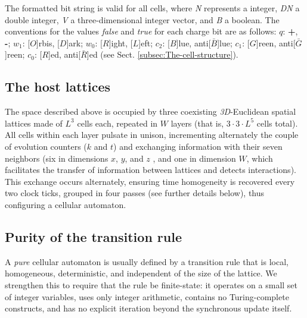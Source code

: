 \documentclass{ijuc}
\begin{document}
\begin{table}
{\small{}The formatted bit string is valid for all cells, where }\emph{\small{}N}{\small{}
represents a integer, }\emph{\small{}DN}{\small{} 
a double integer, }\emph{\small{}V}{\small{} a three-dimensional integer vector, and }\emph{\small{}B}{\small{} 
a boolean. The conventions for the values }\emph{\small{}false}{\small{} and }\emph{\small{}true}{\small{} for each 
charge bit are as follows: $q$: }\textbf{\small{}+}{\small{}, }\textbf{\small{}-}{\small{}; $w_{1}$: {[}$O${]}rbis, {[}$D${]}ark; 
$w_{0}$: {[}$R${]}ight, {[}$L${]}eft; $c_{2}$: {[}$B${]}lue, anti{[}$\bar{B}${]}lue; $c_{1}$: {[}$G${]}reen, anti{[}$\bar{G}${]}reen; 
$c_{0}$: {[}$R${]}ed, anti{[}$\bar{R}${]}ed (see Sect. \ref{subsec:The-cell-structure}).}\label{tab:Cell-structure}
\end{table}

\subsection{The host lattices\label{subsec:The-host-lattice}}

The space described above is occupied by three coexisting \emph{3D}-Euclidean spatial lattices made of $L^{3}$ cells each, repeated in $W  $ layers (that is, $3\cdot3\cdot L^{5}$ cells total).
All cells within each layer pulsate in unison, incrementing alternately the couple of evolution counters ($k$ and $t$) and exchanging information with their seven neighbors (six in dimensions $x$, $y$, and \ensuremath{z} , and one in dimension $W  $, which facilitates the transfer of information between lattices and detects interactions).
This exchange occurs alternately, ensuring time homogeneity is recovered every two clock ticks, grouped in four passes (see further details below), thus configuring a cellular automaton.

\subsection{Purity of the transition rule\label{subsec:purity}}

A \emph{pure} cellular automaton is usually defined by a transition rule that is local, homogeneous, deterministic, and independent of the size of the lattice. We strengthen this to require that the rule be finite-state: it operates on a small set of integer variables, uses only integer arithmetic, contains no Turing-complete constructs, and has no explicit iteration beyond the synchronous update itself.
\end{document}
